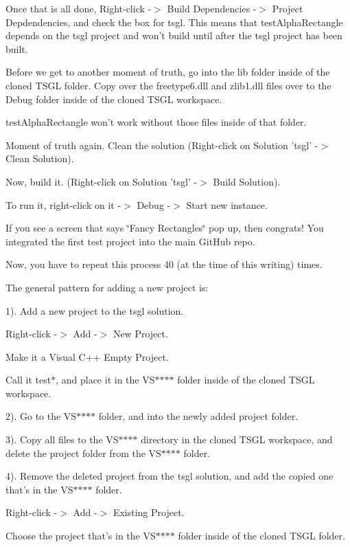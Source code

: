 Once that is all done, Right-\/click -\/$>$ Build Dependencies -\/$>$ Project Depdendencies, and check the box for tsgl. This means that test\-Alpha\-Rectangle depends on the tsgl project and won't build until after the tsgl project has been built.

Before we get to another moment of truth, go into the lib folder inside of the cloned T\-S\-G\-L folder. Copy over the freetype6.\-dll and zlib1.\-dll files over to the Debug folder inside of the cloned T\-S\-G\-L workspace.

test\-Alpha\-Rectangle won't work without those files inside of that folder.

Moment of truth again. Clean the solution (Right-\/click on Solution 'tsgl' -\/$>$ Clean Solution).

Now, build it. (Right-\/click on Solution 'tsgl' -\/$>$ Build Solution).

To run it, right-\/click on it -\/$>$ Debug -\/$>$ Start new instance.

If you see a screen that says \char`\"{}\-Fancy Rectangles\char`\"{} pop up, then congrats! You integrated the first test project into the main Git\-Hub repo.

Now, you have to repeat this process 40 (at the time of this writing) times.

The general pattern for adding a new project is\-:

1). Add a new project to the tsgl solution.
\begin{DoxyItemize}
\item Right-\/click -\/$>$ Add -\/$>$ New Project.
\item Make it a Visual C++ Empty Project.
\item Call it test$\ast$, and place it in the V\-S$\ast$$\ast$$\ast$$\ast$ folder inside of the cloned T\-S\-G\-L workspace.
\end{DoxyItemize}

2). Go to the V\-S$\ast$$\ast$$\ast$$\ast$ folder, and into the newly added project folder.

3). Copy all files to the V\-S$\ast$$\ast$$\ast$$\ast$ directory in the cloned T\-S\-G\-L workspace, and delete the project folder from the V\-S$\ast$$\ast$$\ast$$\ast$ folder.

4). Remove the deleted project from the tsgl solution, and add the copied one that's in the V\-S$\ast$$\ast$$\ast$$\ast$ folder.
\begin{DoxyItemize}
\item Right-\/click -\/$>$ Add -\/$>$ Existing Project.
\item Choose the project that's in the V\-S$\ast$$\ast$$\ast$$\ast$ folder inside of the cloned T\-S\-G\-L folder.
\end{DoxyItemize}

